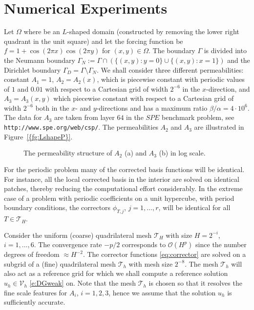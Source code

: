 \documentclass[10pt]{article}
\numberwithin{equation}{section}
\theoremstyle{plain}
\theoremstyle{definition}
\theoremstyle{remark}
\begin{document}
\section{Numerical Experiments}\label{s:numexp}
Let $\Omega$ where be an $L$-shaped domain (constructed by removing the lower right quadrant in the unit square) and let the forcing function be $f=1+\cos(2\pi x)\cos(2\pi y)$ for $(x,y)\in\Omega$. The boundary $\Gamma$ is divided into the Neumann boundary $\Gamma_N:=\Gamma\cap(\{(x,y): y=0\}\cup \{(x,y):  x=1\})$ and the Dirichlet boundary $\Gamma_D=\Gamma\setminus\Gamma_N$. We shall consider three different permeabilities: constant ${A}_1=1$, ${A}_2={A}_2(x)$, which is piecewise constant with periodic values of $1$ and $0.01$ with respect to a Cartesian grid of width $2^{-6}$ in the $x$-direction, and ${A}_3 = {A}_3(x,y)$ which piecewise constant with respect to a Cartesian grid of width $2^{-6}$ both in the $x$- and $y$-directions and has a maximum ratio ${\beta}/{\alpha} = 4\cdot 10^{6}$. The data for ${A}_3$ are taken from layer $64$ in the $SPE$ benchmark problem, see \texttt{http://www.spe.org/web/csp/}. The permeabilities $A_2$ and $A_3$ are illustrated in {Figure~\ref{{fg:LshapeP}}}.
\begin{figure}[th!]
  \centering
  \caption{The permeability structure of $A_2$ (a) and $A_3$ (b) in log scale.}
  \label{fg:LshapeP}
\end{figure}
For the periodic problem many of the corrected basis functions will be identical. For instance, all the local corrected basis in the interior are solved on identical patches, thereby reducing the computational effort considerably. In the extreme case of a problem with periodic coefficients on a unit hypercube, with period boundary conditions, the correctors $\phi_{T,j}$, $j=1,\dots,r$, will be identical for all $T\in{\mathcal{T}}_H$.

Consider the uniform (coarse) quadrilateral mesh ${\mathcal{T}}_H$ with size $H=2^{-i}$, $i=1,\dots,6$. The convergence rate $-p/2$ corresponds to $\mathcal{O}(H^p)$ since the number degrees of freedom $\approx H^{-2}$.
The corrector functions \eqref{eq:corrector} are solved on a subgrid of a (fine) quadrilateral mesh ${\mathcal{T}}_h$ with mesh size $2^{-8}$. The mesh ${\mathcal{T}}_h$ will also act as a reference grid for which we shall compute a reference solution $u_h\in{\mathcal{V}}_h$ \eqref{e:DGweak} on. Note that the mesh ${\mathcal{T}}_h$ is chosen so that it resolves the fine scale features for ${A}_i$, $i=1,2,3$, hence we assume that the solution $u_h$ is sufficiently accurate. 
\end{document}
